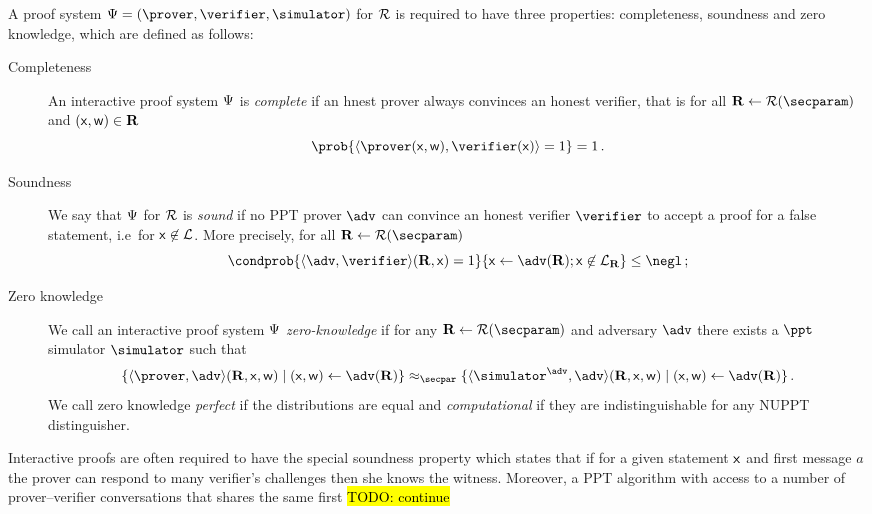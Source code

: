 \documentclass[runningheads]{llncs}
\theoremstyle{definition}
\begin{document}
A proof system $\proofsystem = (\prover, \verifier, \simulator)$ for $\mathcal{R}$ is required to have three properties: completeness, soundness and zero knowledge, which are defined as follows:
\begin{description}
	\item[Completeness] An interactive proof system $\mathrm{\Psi}$ is \emph{complete} if an hnest prover always convinces an honest verifier, that is for all $\REL \gets \RELGEN(\secparam)$ and $(\mathsf{x}, \mathsf{w}) \in \mathbf{R}$
	\[
		\prob{\ip{\prover (\inp, \wit)}{\verifier (\inp)} = 1} = 1\,.
	\]
	\item[Soundness] We say that $\mathrm{\Psi}$ for $\mathcal{R}$ is \emph{sound} if no PPT prover $\adv$ can convince an honest verifier $\verifier$ to accept a proof for a false statement, i.e~for $\mathsf{x} \not\in\mathcal{L}$. More precisely, for all $\REL \gets \RELGEN(\secparam)$
	\[
		\condprob{\ip{\adv}{\verifier}(\REL, \inp) = 1}{\inp \gets \adv(\REL); \inp \not\in \LANG_\REL} \leq \negl\,;
	\]
	\item[Zero knowledge] We call an interactive proof system $\mathrm{\Psi}$ \emph{zero-knowledge} if for any $\REL \gets \RELGEN(\secparam)$ and adversary $\adv$ there exists a $\ppt$ simulator $\simulator$ such that
	\[
	  \smallset{\ip{\prover}{\adv}(\REL, \inp, \wit) \mid (\inp, \wit) \gets \adv(\REL)} \approx_\secpar \smallset{\ip{\simulator^{\adv}}{\adv}(\REL, \inp, \wit) \mid (\inp, \wit) \gets \adv(\REL)}\,.
	\]
	We call zero knowledge \emph{perfect} if the distributions are equal and \emph{computational} if they are indistinguishable for any NUPPT distinguisher.
\end{description}

Interactive proofs are often required to have the special soundness property which states that if for a given statement $\mathsf{x}$ and first message $a$ the prover can respond to many verifier's challenges then she knows the witness. Moreover, a PPT algorithm with access to a number of prover--verifier conversations that shares the same first \hl{TODO: continue}
\end{document}
